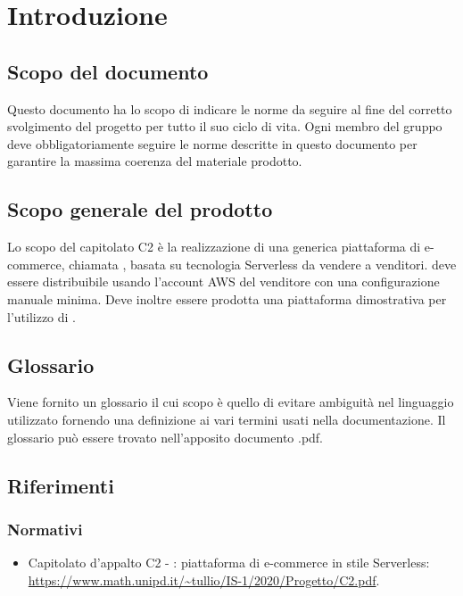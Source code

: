 
\section{Introduzione}
\subsection{Scopo del documento}
Questo documento ha lo scopo di indicare le norme da seguire al fine del corretto svolgimento del progetto per tutto il suo ciclo di vita. 
Ogni membro del gruppo \Omicron{} deve obbligatoriamente seguire le norme descritte in questo documento per garantire la massima coerenza del materiale prodotto.

\subsection{Scopo generale del prodotto}
Lo scopo del capitolato C2 è la realizzazione di una generica piattaforma di e-commerce, chiamata \nameproject{}, basata su tecnologia Serverless da vendere a venditori. \nameproject{} deve essere distribuibile usando l'account AWS del venditore con una configurazione manuale minima. Deve inoltre essere prodotta una piattaforma dimostrativa per l'utilizzo di \nameproject{}.   

\subsection{Glossario}
Viene fornito un glossario il cui scopo è quello di evitare ambiguità nel linguaggio utilizzato fornendo una definizione ai vari termini usati nella documentazione. Il glossario può essere trovato nell'apposito documento \Glossario{}.pdf.

\subsection{Riferimenti}
\subsubsection{Normativi}
\begin{itemize}
\item Capitolato d'appalto C2 - \nameproject{}: piattaforma di e-commerce in stile Serverless:\\ \url{https://www.math.unipd.it/~tullio/IS-1/2020/Progetto/C2.pdf}.
\end{itemize}


